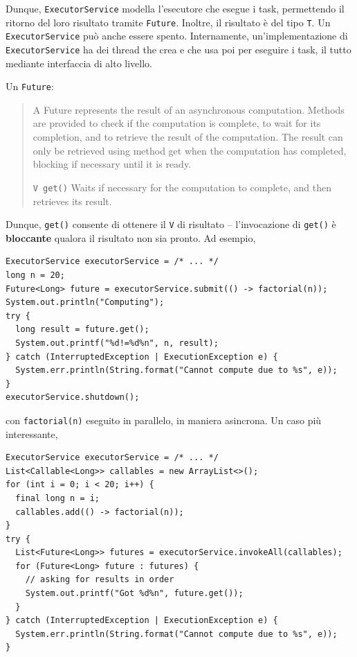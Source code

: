 \documentclass[\fontsizeclass,twocolumn]{\classname}
\theoremstyle{definition}
\theoremstyle{definition}
\begin{document}
Dunque, \texttt{ExecutorService} modella l'esecutore che esegue i task,
permettendo il ritorno del loro risultato tramite \texttt{Future}. Inoltre, il
risultato è del tipo \texttt{T}. Un \texttt{ExecutorService} può anche essere
spento. Internamente, un'implementazione di \texttt{ExecutorService} ha dei
thread the crea e che usa poi per eseguire i task, il tutto mediante
interfaccia di alto livello.

Un \texttt{Future}:
\begin{quote}
    \footnotesize{A Future represents the result of an asynchronous computation. Methods are provided to check if the computation is complete, to wait for its completion, and to retrieve the result of the computation. The result can only be retrieved using method get when the computation has completed, blocking if necessary until it is ready.

    \texttt{V get()} Waits if necessary for the computation to complete, and then retrieves its result.
}
\end{quote}

Dunque, \texttt{get()} consente di ottenere il \texttt{V} di risultato --
l'invocazione di \texttt{get()} è \textbf{bloccante} qualora il risultato non
sia pronto. Ad esempio,

\begin{lstlisting}
ExecutorService executorService = /* ... */
long n = 20;
Future<Long> future = executorService.submit(() -> factorial(n));
System.out.println("Computing");
try {
  long result = future.get();
  System.out.printf("%d!=%d%n", n, result);
} catch (InterruptedException | ExecutionException e) {
  System.err.println(String.format("Cannot compute due to %s", e));
}
executorService.shutdown();
\end{lstlisting}

con \texttt{factorial(n)} eseguito in parallelo, in maniera asincrona.
Un caso più interessante,

\begin{lstlisting}
ExecutorService executorService = /* ... */
List<Callable<Long>> callables = new ArrayList<>();
for (int i = 0; i < 20; i++) {
  final long n = i;
  callables.add(() -> factorial(n));
}
try {
  List<Future<Long>> futures = executorService.invokeAll(callables);
  for (Future<Long> future : futures) {
    // asking for results in order
    System.out.printf("Got %d%n", future.get());
  }
} catch (InterruptedException | ExecutionException e) {
  System.err.println(String.format("Cannot compute due to %s", e));
}
\end{lstlisting}
\end{document}
